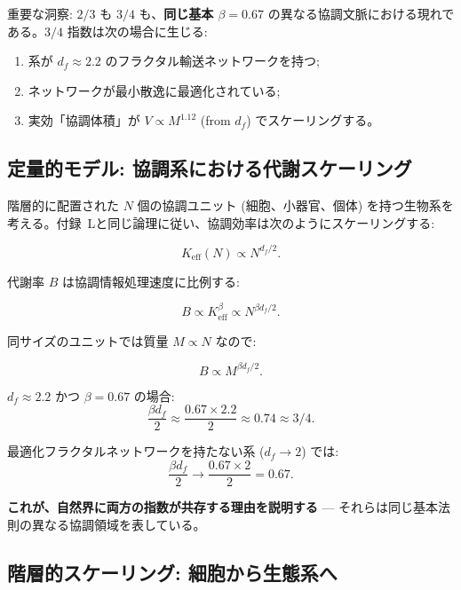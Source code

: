 \documentclass[12pt]{article}
\newcommand{\Keff}{K_{\mathrm{eff}}}
\begin{document}
	重要な洞察: \(2/3\) も \(3/4\) も、\textbf{同じ基本 \(\beta = 0.67\)} の異なる協調文脈における現れである。\(3/4\) 指数は次の場合に生じる:
	\begin{enumerate}
		\item 系が \(d_f \approx 2.2\) のフラクタル輸送ネットワークを持つ;
		\item ネットワークが最小散逸に最適化されている;
		\item 実効「協調体積」が \(V \propto M^{1.12}\) (from \(d_f\)) でスケーリングする。
	\end{enumerate}
	
	\subsection{定量的モデル: 協調系における代謝スケーリング}
	
	階層的に配置された \(N\) 個の協調ユニット (細胞、小器官、個体) を持つ生物系を考える。付録~Lと同じ論理に従い、協調効率は次のようにスケーリングする:
	
	\begin{equation}
		\Keff(N) \propto N^{d_f/2}.
	\end{equation}
	
	代謝率 \(B\) は協調情報処理速度に比例する:
	
	\begin{equation}
		B \propto \Keff^{\beta} \propto N^{\beta d_f/2}.
	\end{equation}
	
	同サイズのユニットでは質量 \(M \propto N\) なので:
	
	\begin{equation}
		B \propto M^{\beta d_f/2}.
	\end{equation}
	
	\(d_f \approx 2.2\) かつ \(\beta = 0.67\) の場合:
	\begin{equation}
		\frac{\beta d_f}{2} \approx \frac{0.67 \times 2.2}{2} \approx 0.74 \approx 3/4.
	\end{equation}
	
	最適化フラクタルネットワークを持たない系 (\(d_f \to 2\)) では:
	\begin{equation}
		\frac{\beta d_f}{2} \to \frac{0.67 \times 2}{2} = 0.67.
	\end{equation}
	
	\textbf{これが、自然界に両方の指数が共存する理由を説明する} — それらは同じ基本法則の異なる協調領域を表している。
	
	\subsection{階層的スケーリング: 細胞から生態系へ}
	
\end{document}
